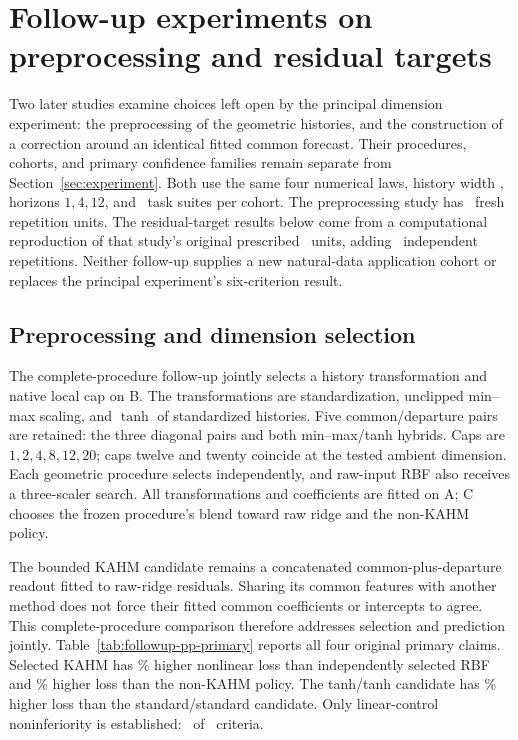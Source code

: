 \section{Follow-up experiments on preprocessing and residual targets}
\label{sec:followup-experiments}

Two later studies examine choices left open by the principal dimension
experiment: the preprocessing of the geometric histories, and the
construction of a correction around an identical fitted common forecast.
Their procedures, cohorts, and primary confidence families remain separate
from Section~\ref{sec:experiment}. Both use the same four numerical laws,
history width \PPHistory, horizons $1,4,12$, and
\PPTasks\ task suites per cohort. The preprocessing study has
\PPRepetitions\ fresh repetition units. The residual-target results below
come from a computational reproduction of that study's original prescribed
\CFRRepetitions\ units, adding \CFRAdditionalRepetitions\ independent
repetitions. Neither follow-up supplies a new natural-data application
cohort or replaces the principal experiment's six-criterion result.

\subsection{Preprocessing and dimension selection}

The complete-procedure follow-up jointly selects a history transformation
and native local cap on B. The transformations are standardization,
unclipped min--max scaling, and $\tanh$ of standardized histories. Five
common/departure pairs are retained: the three diagonal pairs and both
min--max/tanh hybrids. Caps are $1,2,4,8,12,20$; caps twelve and twenty
coincide at the tested ambient dimension. Each geometric procedure selects
independently, and raw-input RBF also receives a three-scaler search.
All transformations and coefficients are fitted on A; C chooses the
frozen procedure's blend toward raw ridge and the non-KAHM policy.

The bounded KAHM candidate remains a concatenated common-plus-departure
readout fitted to raw-ridge residuals. Sharing its common features with
another method does not force their fitted common coefficients or
intercepts to agree. This complete-procedure comparison therefore addresses
selection and prediction jointly. Table~\ref{tab:followup-pp-primary}
reports all four original primary claims. Selected KAHM has
\PPRBFPenalty\% higher nonlinear loss than independently selected RBF and
\PPPolicyPenalty\% higher loss than the non-KAHM policy. The
tanh/tanh candidate has \PPTanhPenalty\% higher loss than the
standard/standard candidate. Only linear-control noninferiority is
established: \PPPrimaryEstablished\ of \PPPrimaryCount\ criteria.


